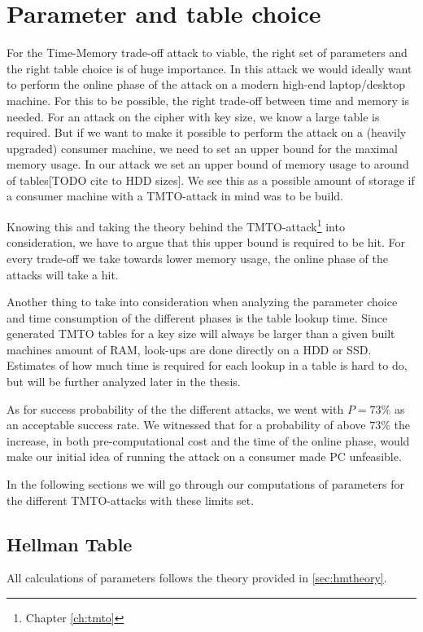\chapter{Parameter and table choice}
\label{ch:param}
For the Time-Memory trade-off attack to viable, the right set of
parameters and the right table choice is of huge importance. In this
attack we would ideally want to perform the online phase of the  attack on a modern
high-end laptop/desktop machine. For this to be possible, the right
trade-off between time and memory is needed. For an attack on the
cipher with  key size, we know a large table is required. But if
we want to make it possible to perform the attack on a (heavily
upgraded) consumer
machine, we need to set an upper bound for the maximal memory
usage. In our attack we set an upper bound of memory usage to around
 of tables[TODO cite to HDD sizes]. We see this as a possible amount of storage if a
consumer machine with a TMTO-attack in mind was to be build.

Knowing this and taking the theory behind the
TMTO-attack\footnote{Chapter \ref{ch:tmto}} into consideration, we
have to argue that this upper bound is required to be hit. For every
trade-off we take towards lower memory usage, the online phase of the
attacks will take a hit.

Another thing to take into consideration when analyzing the parameter
choice and time consumption of the different phases is the table lookup
time. Since generated TMTO tables for a  key size will
always be larger than a given built machines amount of RAM, look-ups are
done directly on a HDD or SSD. Estimates of how much time is required
for each lookup in a table is hard to do, but will be further analyzed
later in the thesis.

As for success probability of the
the different attacks, we went with $P = 73\%$ as an acceptable
success rate.
We witnessed that for a probability of above $73\%$ the increase,
in both pre-computational cost and the time of the online phase, would
make our initial idea of running the attack on a consumer made PC
unfeasible.

In the following sections we will go through our computations of
parameters for the different TMTO-attacks with these limits set.

\section{Hellman Table}
All calculations of parameters follows the theory provided in
\ref{sec:hmtheory}.

